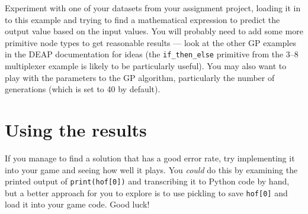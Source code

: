 \documentclass{article}
\begin{document}
Experiment with one of your datasets from your assignment project, loading it in to this example
and trying to find a mathematical expression to predict the output value based on the input values.
You will probably need to add some more primitive node types to get reasonable results ---
look at the other GP examples in the DEAP documentation for ideas (the \lstinline{if_then_else} primitive from the 3--8 multiplexer example is likely to be particularly useful).
You may also want to play with the parameters to the GP algorithm, particularly the number of generations (which is set to 40 by default).

\section*{Using the results}

If you manage to find a solution that has a good error rate, try implementing it into your game and seeing how well it plays.
You \emph{could} do this by examining the printed output of \lstinline{print(hof[0])} and transcribing it to Python code by hand,
but a better approach for you to explore is to use pickling to save \lstinline{hof[0]} and load it into your game code. Good luck!
\end{document}
